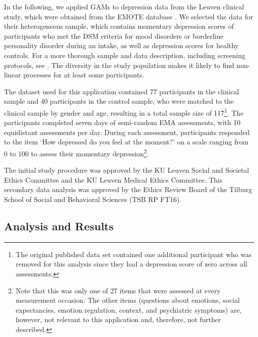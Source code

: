 \documentclass[man, floatsintext]{apa7}
\begin{document}
In the following, we applied GAMs to depression data from the Leuven clinical
study, which were obtained from the EMOTE database
\parencite{kalokerinos_emote_nodate}. We selected the data for their
heterogeneous sample, which contains momentary depression scores of
participants who met the DSM criteria for mood disorders or borderline
personality disorder during an intake, as well as depression scores for healthy
controls. For a more thorough sample and data description, including screening
protocols, see \textcite{heininga_dynamical_2019}. The diversity in the study
population makes it likely to find non-linear processes for at least some
participants.

The dataset used for this application contained 77 participants in the clinical
sample and 40 participants in the control sample, who were matched to the
clinical sample by gender and age, resulting in a total sample size of
117\footnote{The original published data set contained one additional
  participant who was removed for this analysis since they had a depression
  score
  of zero across all assessments.}. The participants completed seven days of
semi-random EMA assessments, with 10 equidistant assessments per day. During
each assessment, participants responded to the item `How depressed do you feel
at the moment?' on a scale ranging from 0 to 100 to assess their momentary
depression\footnote{Note that this was only one of 27 items that were assessed
  at every measurement occasion. The other items (questions about emotions,
  social expectancies, emotion regulation, context, and psychiatric symptoms)
  are, however, not relevant to this application and, therefore, not further
  described.}.

The initial study procedure was approved by the KU Leuven Social and Societal
Ethics Committee and the KU Leuven Medical Ethics Committee. This secondary
data analysis was approved by the Ethics Review Board of the Tilburg School
of Social and Behavioral Sciences (TSB RP FT16).

\subsection{Analysis and Results}
\end{document}
